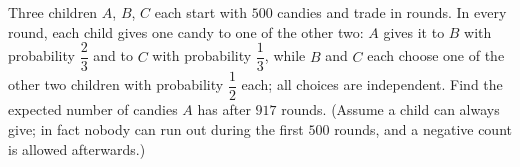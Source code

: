 Three children $A$, $B$, $C$ each start with $500$ candies and trade in rounds. In every round, each child gives one candy to one of the other two: $A$ gives it to $B$ with probability $\dfrac23$ and to $C$ with probability $\dfrac13$, while $B$ and $C$ each choose one of the other two children with probability $\dfrac12$ each; all choices are independent. Find the expected number of candies $A$ has after $917$ rounds. (Assume a child can always give; in fact nobody can run out during the first $500$ rounds, and a negative count is allowed afterwards.)
